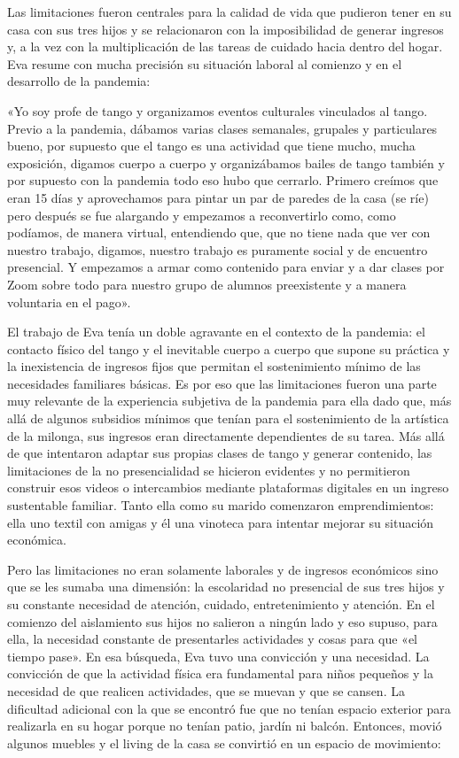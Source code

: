 \begin{refsection}
Las limitaciones fueron centrales para la calidad de vida que pudieron tener en su casa con sus tres hijos y se relacionaron con la imposibilidad de generar ingresos y, a la vez con la multiplicación de las tareas de cuidado hacia dentro del hogar. Eva resume con mucha precisión su situación laboral al comienzo y en el desarrollo de la pandemia:


\begin{gbcita}
«Yo soy profe de tango y organizamos eventos culturales vinculados al tango. Previo a la pandemia, dábamos varias clases semanales, grupales y particulares bueno, por supuesto que el tango es una actividad que tiene mucho, mucha exposición, digamos cuerpo a cuerpo y organizábamos bailes de tango también y por supuesto con la pandemia todo eso hubo que cerrarlo. Primero creímos que eran 15 días y aprovechamos para pintar un par de paredes de la casa (se ríe) pero después se fue alargando y empezamos a reconvertirlo como, como podíamos, de manera virtual, entendiendo que, que no tiene nada que ver con nuestro trabajo, digamos, nuestro trabajo es puramente social y de encuentro presencial. Y empezamos a armar como contenido para enviar y a dar clases por Zoom sobre todo para nuestro grupo de alumnos preexistente y a manera voluntaria en el pago».

\end{gbcita}

El trabajo de Eva tenía un doble agravante en el contexto de la pandemia: el contacto físico del tango y el inevitable cuerpo a cuerpo que supone su práctica y la inexistencia de ingresos fijos que permitan el sostenimiento mínimo de las necesidades familiares básicas. Es por eso que las limitaciones fueron una parte muy relevante de la experiencia subjetiva de la pandemia para ella dado que, más allá de algunos subsidios mínimos que tenían para el sostenimiento de la artística de la milonga, sus ingresos eran directamente dependientes de su tarea. Más allá de que intentaron adaptar sus propias clases de tango y generar contenido, las limitaciones de la no presencialidad se hicieron evidentes y no permitieron construir esos videos o intercambios mediante plataformas digitales en un ingreso sustentable familiar. Tanto ella como su marido comenzaron emprendimientos: ella uno textil con amigas y él una vinoteca para intentar mejorar su situación económica.

Pero las limitaciones no eran solamente laborales y de ingresos económicos sino que se les sumaba una dimensión: la escolaridad no presencial de sus tres hijos y su constante necesidad de atención, cuidado, entretenimiento y atención. En el comienzo del aislamiento sus hijos no salieron a ningún lado y eso supuso, para ella, la necesidad constante de presentarles actividades y cosas para que «el tiempo pase». En esa búsqueda, Eva tuvo una convicción y una necesidad. La convicción de que la actividad física era fundamental para niños pequeños y la necesidad de que realicen actividades, que se muevan y que se cansen. La dificultad adicional con la que se encontró fue que no tenían espacio exterior para realizarla en su hogar porque no tenían patio, jardín ni balcón. Entonces, movió algunos muebles y el living de la casa se convirtió en un espacio de movimiento:



\end{refsection}
